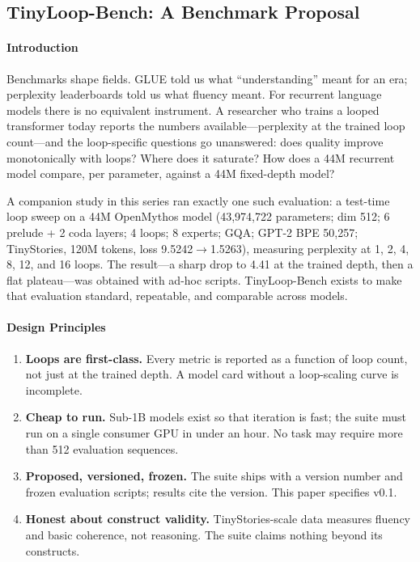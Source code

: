 \subsection{TinyLoop-Bench: A Benchmark Proposal}
\label{ch-bench}

\paragraph{Introduction}

Benchmarks shape fields. GLUE told us what ``understanding'' meant for
an era; perplexity leaderboards told us what fluency meant. For
recurrent language models there is no equivalent instrument. A
researcher who trains a looped transformer today reports the numbers
available---perplexity at the trained loop count---and the
loop-specific questions go unanswered: does quality improve
monotonically with loops? Where does it saturate? How does a 44M
recurrent model compare, per parameter, against a 44M fixed-depth
model?

A companion study in this series ran exactly one such evaluation: a
test-time loop sweep on a 44M OpenMythos model (43,974,722 parameters;
dim 512; 6 prelude + 2 coda layers; 4 loops; 8 experts; GQA; GPT-2
BPE 50,257; TinyStories, 120M tokens, loss 9.5242$\rightarrow$1.5263),
measuring perplexity at 1, 2, 4, 8, 12, and 16 loops. The result---a
sharp drop to 4.41 at the trained depth, then a flat plateau---was
obtained with ad-hoc scripts. TinyLoop-Bench exists to make that
evaluation standard, repeatable, and comparable across models.

\paragraph{Design Principles}

\begin{enumerate}
\item \textbf{Loops are first-class.} Every metric is reported as a
function of loop count, not just at the trained depth. A model card
without a loop-scaling curve is incomplete.
\item \textbf{Cheap to run.} Sub-1B models exist so that iteration is
fast; the suite must run on a single consumer GPU in under an hour.
No task may require more than 512 evaluation sequences.
\item \textbf{Proposed, versioned, frozen.} The suite ships with a
version number and frozen evaluation scripts; results cite the
version. This paper specifies v0.1.
\item \textbf{Honest about construct validity.} TinyStories-scale
data \citep{eldan2023tinystories} measures fluency and basic
coherence, not reasoning. The suite claims nothing beyond its
constructs.
\end{enumerate}

